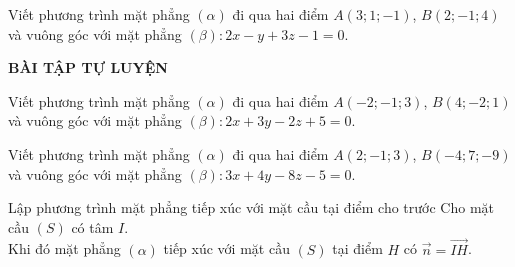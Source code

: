 \begin{vd}%
Viết phương trình mặt phẳng $(\alpha)$ đi qua hai điểm $A\left(3;1;-1\right)$, $B\left(2;-1;4\right)$ và vuông góc với mặt phẳng $(\beta): 2x-y+3z-1=0$.
\end{vd}

\begin{center}
    \textbf{BÀI TẬP TỰ LUYỆN}
\end{center}
\begin{bt}%
 Viết phương trình mặt phẳng $(\alpha)$ đi qua hai điểm $A\left(-2;-1;3\right)$, $B\left(4;-2;1\right)$ và vuông góc với mặt phẳng $(\beta): 2x+3y-2z+5=0$.
\end{bt}

\begin{bt}%
    Viết phương trình mặt phẳng $(\alpha)$ đi qua hai điểm $A\left(2;-1;3\right)$, $B\left(-4;7;-9\right)$ và vuông góc với mặt phẳng $(\beta): 3x+4y-8z-5=0$.
\end{bt}

\begin{dang}{Lập phương trình mặt phẳng tiếp xúc với mặt cầu tại điểm cho trước}
   Cho mặt cầu $(S)$ có tâm $I$.\\
    Khi đó mặt phẳng $(\alpha)$ tiếp xúc với mặt cầu $(S)$ tại điểm $H$ có $\overrightarrow{n}=\overrightarrow{IH}$.
\end{dang}

